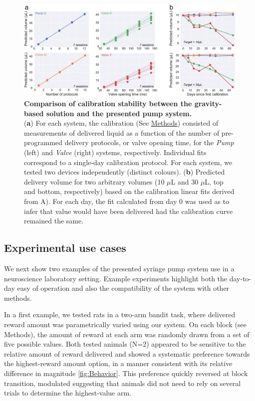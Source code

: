 \begin{figure} 
	\centering
	\includegraphics[width=1.0\linewidth]{Figures/Artboard 2.pdf}
	\caption{\textbf{Comparison of calibration stability between the gravity-based solution and the presented pump system.}\\
		(\textbf{a}) For each system, the calibration (See \hyperref[s:methods]{Methods}) consisted of measurements of delivered liquid as a function of the number of pre-programmed delivery protocols, or valve opening time, for the \textit{Pump} (left) and \textit{Valve} (right) systems, respectively. Individual fits correspond to a single-day calibration protocol. For each system, we tested two devices independently (distinct colours). (\textbf{b}) Predicted delivery volume for two arbitrary volumes (10 $\mu$L and 30 $\mu$L, top and bottom, respectively) based on the calibration linear fits derived from A). For each day, the fit calculated from day 0 was used as to infer that value would have been delivered had the calibration curve remained the same.}
	\label{fig:PumpVsValve} 
\end{figure}


\subsection*{Experimental use cases}

We next show two examples of the presented syringe pump system use in a neuroscience laboratory setting. Example experiments highlight both the day-to-day easy of operation and also the compatibility of the system with other methods.

In a first example, we tested rats in a two-arm bandit task, where delivered reward amount was parametrically varied using our system. On each block (see Methods), the amount of reward at each arm was randomly drawn from a set of five possible values. Both tested animals (N=2) appeared to be sensitive to the relative amount of reward delivered and showed a systematic preference towards the highest-reward amount option, in a manner consistent with its relative difference in magnitude \cref{fig:Behavior}. This preference quickly reversed at block transition, modulated suggesting that animals did not need to rely on several trials to determine the highest-value arm.

